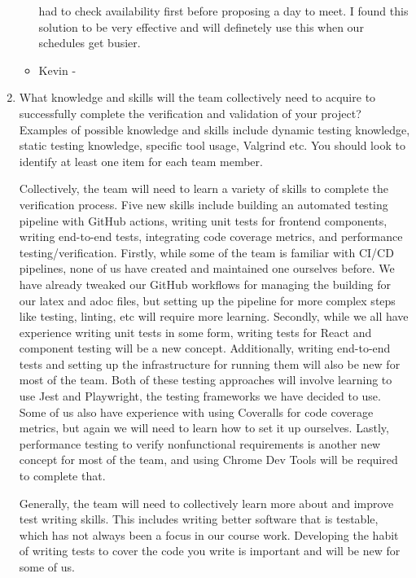 \documentclass[12pt, titlepage]{article}
\begin{document}
\begin{enumerate}
\begin{itemize}
      had to check availability first before proposing a day to meet. I found
      this solution to be very effective and will definetely use this
      when our schedules get busier.
    \item Kevin -
  \end{itemize}
  \item What knowledge and skills will the team collectively need to acquire to
  successfully complete the verification and validation of your project?
  Examples of possible knowledge and skills include dynamic testing knowledge,
  static testing knowledge, specific tool usage, Valgrind etc.  You should look to
  identify at least one item for each team member.

    Collectively, the team will need to learn a variety of skills to complete
    the verification process. Five new skills include building an automated
    testing pipeline with GitHub actions, writing unit tests for frontend
    components, writing end-to-end tests, integrating code coverage metrics,
    and performance testing/verification. Firstly, while some of the team is
    familiar with CI/CD pipelines, none of us have created and maintained one
    ourselves before. We have already tweaked our GitHub workflows for managing
    the building for our latex and adoc files, but setting up the pipeline for
    more complex steps like testing, linting, etc will require more learning.
    Secondly, while we all have experience writing unit tests in some form,
    writing tests for React and component testing will be a new concept.
    Additionally, writing end-to-end tests and setting up the infrastructure
    for running them will also be new for most of the team. Both of these
    testing approaches will involve learning to use Jest and Playwright, the
    testing frameworks we have decided to use. Some of us also have experience
    with using Coveralls for code coverage metrics, but again we will need to
    learn how to set it up ourselves. Lastly, performance testing to verify
    nonfunctional requirements is another new concept for most of the team, and
    using Chrome Dev Tools will be required to complete that.

    Generally, the team will need to collectively learn more about and improve
    test writing skills. This includes writing better software that is
    testable, which has not always been a focus in our course work. Developing
    the habit of writing tests to cover the code you write is important and
    will be new for some of us.


\end{enumerate}
\end{document}
